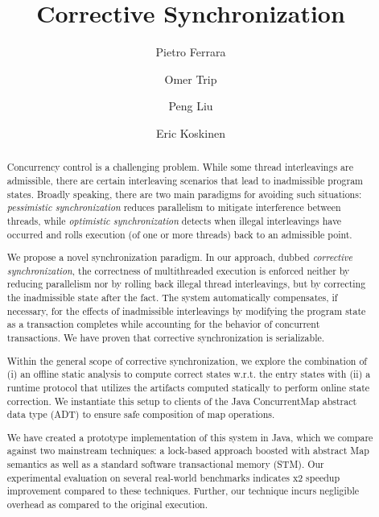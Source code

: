 \documentclass{llncs}
\begin{document}
\title{Corrective Synchronization}



\author{
  Pietro Ferrara 
  \and Omer Trip 
  \and Peng Liu 
  \and Eric Koskinen 
}
\maketitle

\begin{abstract}
Concurrency control is a challenging problem. While some thread interleavings are admissible, there are certain interleaving scenarios that lead to inadmissible program states. Broadly speaking, there are two main paradigms for avoiding such situations: \emph{pessimistic synchronization} reduces parallelism to mitigate interference between threads, while \emph{optimistic synchronization} detects when illegal interleavings have occurred and rolls execution (of one or more threads) back to an admissible point.

We propose a novel synchronization paradigm. In our approach, dubbed \emph{corrective synchronization}, the correctness of multithreaded execution is enforced neither by reducing parallelism nor by rolling back illegal thread interleavings, but by correcting the inadmissible state after the fact. The system automatically compensates, if necessary, for the effects of inadmissible interleavings by modifying the program state as a transaction completes while accounting for the behavior of concurrent transactions. We have proven that corrective synchronization is serializable.

Within the general scope of corrective synchronization, we explore the combination of (i) an offline static analysis to compute correct states w.r.t. the entry states with (ii) a runtime protocol that utilizes the artifacts computed statically to perform online state correction. We instantiate this setup to clients of the Java {\sf ConcurrentMap} abstract data type (ADT) to ensure safe composition of map operations.

We have created a prototype implementation of this system in Java, which we compare against two mainstream techniques: a lock-based approach boosted with abstract {\sf Map} semantics as well as a standard software transactional memory (STM). Our experimental evaluation on several real-world benchmarks indicates x2 speedup improvement compared to these techniques. Further, our technique incurs negligible overhead as compared to the original execution.
\end{abstract}
\end{document}
